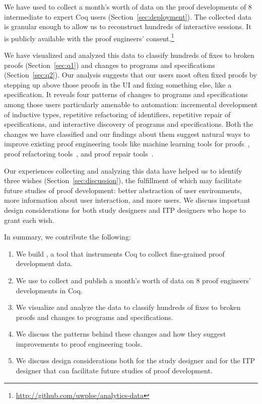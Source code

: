 We have used \toolname to collect a month's worth of data on 
the proof developments of 8 intermediate to expert Coq users
(Section~\ref{sec:deployment}). The collected data is granular enough to
allow us to reconstruct hundreds of interactive sessions.
It is publicly available with the proof engineers' 
consent.\footnote{\url{http://github.com/uwplse/analytics-data}}

We have visualized and analyzed this data to classify hundreds of fixes 
to broken proofs (Section~\ref{sec:q1}) and changes to programs and 
specifications (Section~\ref{sec:q2}).
Our analysis suggests that our users most often fixed proofs by stepping 
up above those proofs in the UI and fixing something else, like a specification.
It reveals four patterns of changes to programs and specifications
among those users particularly amenable to automation: 
incremental development of inductive types, repetitive refactoring
of identifiers, repetitive repair of specifications, and interactive
discovery of programs and specifications.
Both the changes we have classified and our findings about them suggest
natural ways to improve existing proof engineering tools like 
machine learning tools for proofs~\cite{proverbot9001,
Komendantskaya2012, Heras2013, Nagashima2018, Gauthier2017b, Yang2019}, 
proof refactoring tools~\cite{wibergh2019, WhitesidePhD, Dietrich2013,
adams2015, Bourke12, Roe2016, robert2018},
and proof repair tools~\cite{Ringer2018, robert2018}.

Our experiences collecting and analyzing this data have helped
us to identify three wishes (Section~\ref{sec:discussion}), 
the fulfillment of which may facilitate future studies of proof development:
better abstraction of user environments, more information
about user interaction, and more users.
We discuss important design considerations
for both study designers and ITP designers who hope to grant each wish.

In summary, we contribute the following:

\begin{enumerate}
    \item We build \toolname, a tool that instruments Coq to collect
    fine-grained proof development data.
    \item We use \toolname to collect and publish a month's 
    worth of data on 8 proof engineers' developments in Coq.
    \item We visualize and analyze the data to classify hundreds of fixes
    to broken proofs and changes to programs and specifications.
    \item We discuss the patterns behind these changes and how they suggest
    improvements to proof engineering tools.
    \item We discuss design considerations both for the study designer and
    for the ITP designer that can facilitate future studies of 
    proof development.
\end{enumerate}




